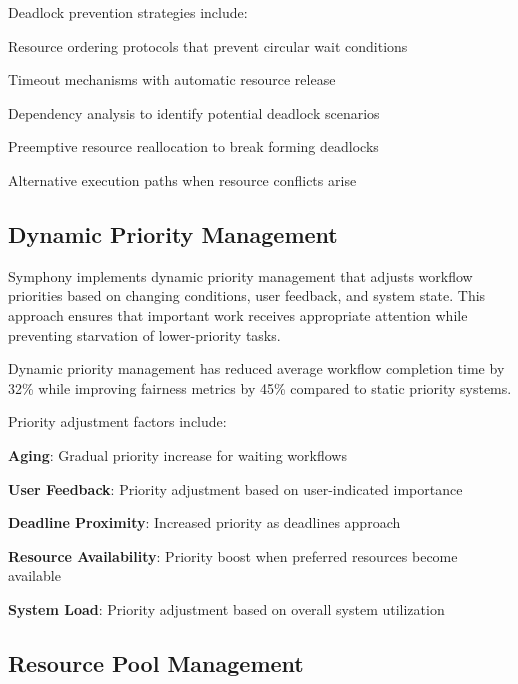 Deadlock prevention strategies include:

\begin{compactlist}
    \item Resource ordering protocols that prevent circular wait conditions
    \item Timeout mechanisms with automatic resource release
    \item Dependency analysis to identify potential deadlock scenarios
    \item Preemptive resource reallocation to break forming deadlocks
    \item Alternative execution paths when resource conflicts arise
\end{compactlist}

\subsection*{Dynamic Priority Management}

Symphony implements dynamic priority management that adjusts workflow priorities based on changing conditions, user feedback, and system state. This approach ensures that important work receives appropriate attention while preventing starvation of lower-priority tasks.

\begin{successbox}
Dynamic priority management has reduced average workflow completion time by 32\% while improving fairness metrics by 45\% compared to static priority systems.
\end{successbox}

Priority adjustment factors include:

\begin{expandedlist}
    \item \textbf{Aging}: Gradual priority increase for waiting workflows
    \item \textbf{User Feedback}: Priority adjustment based on user-indicated importance
    \item \textbf{Deadline Proximity}: Increased priority as deadlines approach
    \item \textbf{Resource Availability}: Priority boost when preferred resources become available
    \item \textbf{System Load}: Priority adjustment based on overall system utilization
\end{expandedlist}

\subsection*{Resource Pool Management}


